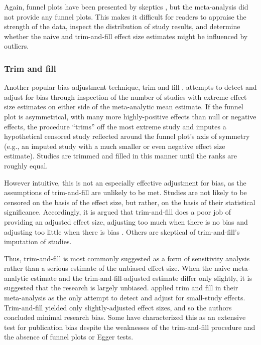 \documentclass[man]{apa6}
\begin{document}
Again, funnel plots have been presented by skeptics \citep[e.g.,][]{Ferguson:2007}, but the \citet{Anderson:etal:2010} meta-analysis did not provide any funnel plots. This makes it difficult for readers to appraise the strength of the data, inspect the distribution of study results, and determine whether the naive and trim-and-fill effect size estimates might be influenced by outliers.

\subsubsection{Trim and fill}
Another popular bias-adjustment technique, trim-and-fill \citep{Duval:Tweedie:2000}, attempts to detect and adjust for bias through inspection of the number of studies with extreme effect size estimates on either side of the meta-analytic mean estimate. If the funnel plot is asymmetrical, with many more highly-positive effects than null or negative effects, the procedure ``trims'' off the most extreme study and imputes a hypothetical censored study reflected around the funnel plot's axis of symmetry (e.g., an imputed study with a much smaller or even negative effect size estimate). Studies are trimmed and filled in this manner until the ranks are roughly equal. 

However intuitive, this is not an especially effective adjustment for bias, as the assumptions of trim-and-fill are unlikely to be met. Studies are not likely to be censored on the basis of the effect size, but rather, on the basis of their statistical significance. Accordingly, it is argued that trim-and-fill does a poor job of providing an adjusted effect size, adjusting too much when there is no bias and adjusting too little when there is bias \citep{Lakens:2014,Simonsohn:etal:2014b}. %
Others are skeptical of trim-and-fill's imputation of studies. %

Thus, trim-and-fill is most commonly suggested as a form of sensitivity analysis rather than a serious estimate of the unbiased effect size. When the naive meta-analytic estimate and the trim-and-fill-adjusted estimate differ only slightly, it is suggested that the research is largely unbiased.
\citet{Anderson:etal:2010} applied trim and fill in their meta-analysis as the only attempt to detect and adjust for small-study effects. Trim-and-fill yielded only slightly-adjusted effect sizes, and so the authors concluded minimal research bias.  %
Some have characterized this as an extensive test for publication bias \citep[][pg. 51]{Bushman:Huesmann:2014} despite the weaknesses of the trim-and-fill procedure and the absence of funnel plots or Egger tests.
\end{document}
